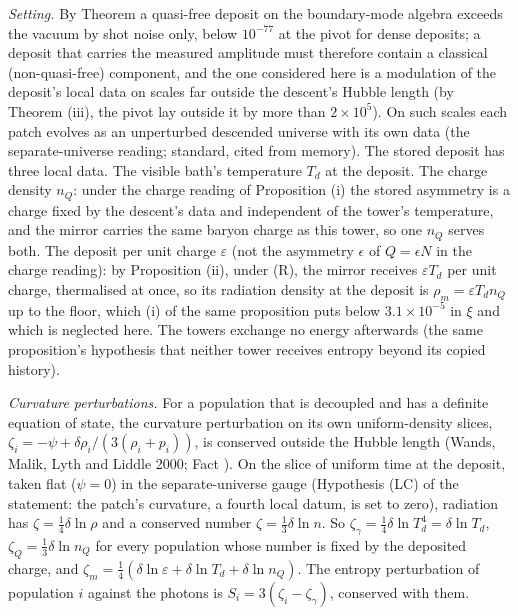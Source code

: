 \emph{Setting.} By Theorem  a quasi-free deposit on the boundary-mode algebra exceeds the vacuum by shot noise only, below $10^{-77}$ at the pivot for dense deposits; a deposit that carries the measured amplitude must therefore contain a classical (non-quasi-free) component, and the one considered here is a modulation of the deposit's local data on scales far outside the descent's Hubble length (by Theorem (iii), the pivot lay outside it by more than $2 \times 10^{5}$). On such scales each patch evolves as an unperturbed descended universe with its own data (the separate-universe reading; standard, cited from memory). The stored deposit has three local data. The visible bath's temperature $T_{d}$ at the deposit. The charge density $n_{Q}$: under the charge reading of Proposition (i) the stored asymmetry is a charge fixed by the descent's data and independent of the tower's temperature, and the mirror carries the same baryon charge as this tower, so one $n_{Q}$ serves both. The deposit per unit charge $\varepsilon$ (not the asymmetry $\epsilon$ of $Q = \epsilon N$ in the charge reading): by Proposition (ii), under (R), the mirror receives $\varepsilon T_{d}$ per unit charge, thermalised at once, so its radiation density at the deposit is $\rho_{m} = \varepsilon T_{d}n_{Q}$ up to the floor, which (i) of the same proposition puts below $3.1 \times 10^{-5}$ in $\xi$ and which is neglected here. The towers exchange no energy afterwards (the same proposition's hypothesis that neither tower receives entropy beyond its copied history).

\emph{Curvature perturbations.} For a population that is decoupled and has a definite equation of state, the curvature perturbation on its own uniform-density slices, $\zeta_{i} = -\psi + \delta\rho_{i}/(3(\rho_{i} + p_{i}))$, is conserved outside the Hubble length (Wands, Malik, Lyth and Liddle 2000; Fact ). On the slice of uniform time at the deposit, taken flat ($\psi = 0$) in the separate-universe gauge (Hypothesis (LC) of the statement: the patch's curvature, a fourth local datum, is set to zero), radiation has $\zeta = \tfrac14\delta\ln\rho$ and a conserved number $\zeta = \tfrac13\delta\ln n$. So $\zeta_{\gamma} = \tfrac14\delta\ln T_{d}^{4} = \delta\ln T_{d}$, $\zeta_{Q} = \tfrac13\delta\ln n_{Q}$ for every population whose number is fixed by the deposited charge, and $\zeta_{m} = \tfrac14(\delta\ln\varepsilon + \delta\ln T_{d} + \delta\ln n_{Q})$. The entropy perturbation of population $i$ against the photons is $S_{i} = 3(\zeta_{i} - \zeta_{\gamma})$, conserved with them.


